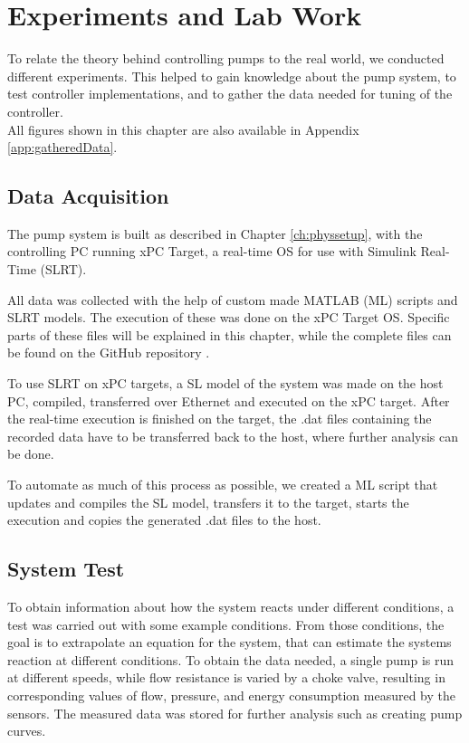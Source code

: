 \chapter{Experiments and Lab Work}\label{ch:experiment}
To relate the theory behind controlling pumps to the real world,
we conducted different experiments.
This helped to gain knowledge about the pump system,
to test controller implementations, and to gather the data needed for tuning of the controller.
\\
All figures shown in this chapter are also available in Appendix \ref{app:gatheredData}.

\section{Data Acquisition}\label{sec:data_gathering}
The pump system is built as described in Chapter \ref{ch:physsetup},
with the controlling PC running xPC Target,
a real-time OS for use with
Simulink\textsuperscript{\textregistered{}} Real-Time\texttrademark{}
(SLRT). 

All data was collected with the help of custom made MATLAB\textsuperscript{\textregistered{}}
(ML) scripts and SLRT models.
The execution of these was done on the xPC Target OS.
Specific parts of these files will be explained in this chapter,
while the complete files can be found on the GitHub repository \cite{GitHub}.

To use SLRT on xPC targets, a SL model of the system was made on the host PC,
compiled, transferred over Ethernet and executed on the xPC target.
After the real-time execution is finished on the target,
the .dat files containing the recorded data have to be transferred back to the host,
where further analysis can be done.

To automate as much of this process as possible,
we created a ML script that updates and compiles the SL model, transfers it to the target,
starts the execution and copies the generated .dat files to the host.

\section{System Test}\label{sec:system_test} 
To obtain information about how the system reacts under different conditions,
a test was carried out with some example conditions.
From those conditions, the goal is to extrapolate an equation for the system,
that can estimate the systems reaction at different conditions.
To obtain the data needed,
a single pump is run at different speeds,
while flow resistance is varied by a choke valve,
resulting in corresponding values of flow, pressure, and energy consumption
measured by the sensors.
The measured data was stored for further analysis such as creating pump curves.

